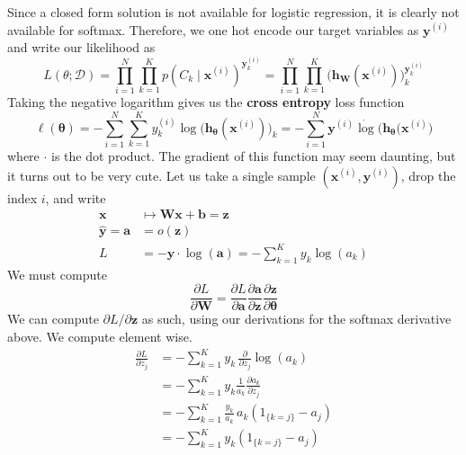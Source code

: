 \documentclass{article}
\begin{document}
    \begin{theorem}
      Since a closed form solution is not available for logistic regression, it is clearly not available for softmax. Therefore, we one hot encode our target variables as $\mathbf{y}^{(i)}$ and write our likelihood as 
      \begin{equation}
        L(\theta; \mathcal{D}) = \prod_{i=1}^N \prod_{k=1}^K p(C_k \mid \mathbf{x}^{(i)})^{\mathbf{y}^{(i)}_k} = \prod_{i=1}^N \prod_{k=1}^K \big( \mathbf{h}_\mathbf{W} (\mathbf{x}^{(i)})\big)_k^{\mathbf{y}_k^{(i)}}
      \end{equation}
      Taking the negative logarithm gives us the \textbf{cross entropy} loss function
      \begin{equation}
        \ell (\boldsymbol{\theta}) = - \sum_{i=1}^N \sum_{k=1}^K y^{(i)}_k \log \big( \mathbf{h}_{\boldsymbol{\theta}} (\mathbf{x}^{(i)})\big)_k = - \sum_{i=1}^N \mathbf{y}^{(i)} \dot \log \big( \mathbf{h}_{\boldsymbol{\theta}} (\mathbf{x}^{(i)} \big)
      \end{equation}
      where $\cdot$ is the dot product. The gradient of this function may seem daunting, but it turns out to be very cute. Let us take a single sample $(\mathbf{x}^{(i)}, \mathbf{y}^{(i)})$, drop the index $i$, and write
      \begin{align*}
        \mathbf{x} & \mapsto \mathbf{W} \mathbf{x} + \mathbf{b} = \mathbf{z} \\
        \hat{\mathbf{y}} = \mathbf{a} & = o (\mathbf{z}) \\
        L & = - \mathbf{y} \cdot \log (\mathbf{a}) = - \sum_{k=1}^K y_k \log(a_k)
      \end{align*}
      We must compute 
      \[\frac{\partial L}{\partial \mathbf{W}} = \frac{\partial L}{\partial \mathbf{a}} \frac{\partial \mathbf{a}}{\partial \mathbf{z}} \frac{\partial \mathbf{z}}{\partial \boldsymbol{\theta}}\]
      We can compute $\partial L /\partial \mathbf{z}$ as such, using our derivations for the softmax derivative above. We compute element wise. 
      \begin{align*}
        \frac{\partial L}{\partial z_j} & = - \sum_{k=1}^K y_k \, \frac{\partial}{\partial z_j} \log (a_k) \\
        & = - \sum_{k=1}^K y_k \frac{1}{a_k} \frac{\partial a_k}{\partial z_j} \\
        & = - \sum_{k=1}^K \frac{y_k}{a_k} \, a_k (1_{\{k = j\}} - a_j) \\
        & = - \sum_{k=1}^K y_k (1_{\{k = j\}} - a_j) \\

\end{align*}
\end{theorem}
\end{document}
